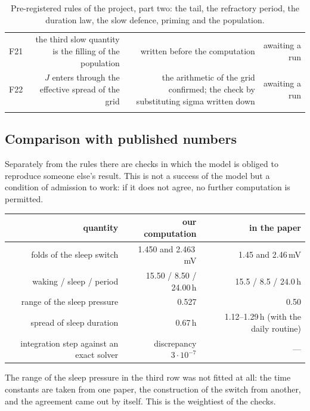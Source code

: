 \begin{table}[p]
\begin{tabular}{@{}R{0.04}R{0.30}R{0.32}R{0.27}@{}}
F21 & the third slow quantity is the filling of the population & written before the computation & awaiting a run\\
F22 & $J$ enters through the effective spread of the grid & the arithmetic of the grid confirmed; the check by substituting sigma written down & awaiting a run\\\\
\bottomrule
\end{tabular}
\caption{Pre-registered rules of the project, part two: the tail, the refractory period, the duration law, the slow defence, priming and the population.}
\end{table}

\subsection{Comparison with published numbers}
Separately from the rules there are checks in which the model is obliged to reproduce someone else's result. This is not a success of the model but a condition of admission to work: if it does not agree, no further computation is permitted.

{\small
\begin{tabular}{@{}R{0.34}R{0.28}R{0.30}@{}}
\toprule
\textbf{quantity} & \textbf{our computation} & \textbf{in the paper}\\
\midrule
folds of the sleep switch & 1.450 and 2.463\,mV & 1.45 and 2.46\,mV\\
waking / sleep / period & 15.50 / 8.50 / 24.00\,h & 15.5 / 8.5 / 24.0\,h\\
range of the sleep pressure & 0.527 & 0.50\\
spread of sleep duration & 0.67\,h & 1.12--1.29\,h (with the daily routine)\\
integration step against an exact solver & discrepancy $3\cdot10^{-7}$ & ---\\
\bottomrule
\end{tabular}}

The range of the sleep pressure in the third row was not fitted at all: the time constants are taken from one paper, the construction of the switch from another, and the agreement came out by itself. This is the weightiest of the checks.

